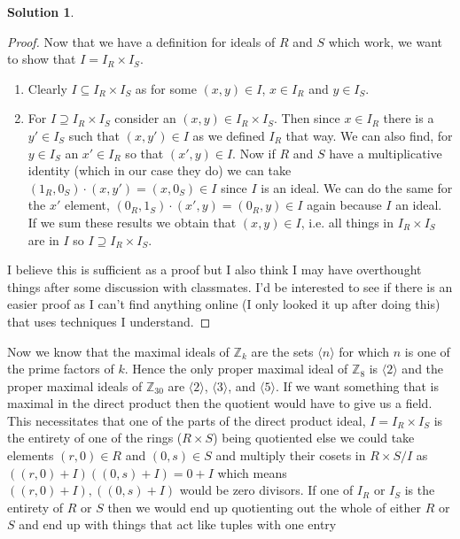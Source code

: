 \documentclass[10pt]{article}
\theoremstyle{definition}
\newtheorem{soln}{Solution}
\newcommand{\hull}[1]{\langle {#1}\rangle}
\begin{document}
\begin{soln}
\begin{enumerate}[label=(\alph*)]
\begin{proof}
            Now that we have a definition for ideals of $R$ and $S$ which work,
            we want to show that $I=I_R\times I_S$.
            \begin{enumerate}
              \item Clearly $I\subseteq I_R\times I_S$ as for some
                    $(x,y)\in I$, $x\in I_R$ and $y \in I_S$.
              \item For $I\supseteq  I_R\times I_S$ consider an $(x,y)\in I_R\times I_S$. Then since
                    $x \in I_R$ there is a $y'\in I_S$ such that $(x,y')\in I$ as we defined $I_R$ that way. We can also find,
                    for $y \in I_S$ an $x'\in I_R$ so that $(x',y)\in I$. Now if $R$ and $S$ have a multiplicative identity (which in our case
                    they do) we can take $(1_R,0_S)\cdot(x,y')=(x,0_S)\in I$ since $I$ is an ideal. We can do the same for the $x'$ element,
                    $(0_R,1_S)\cdot(x',y)=(0_R,y)\in I$ again because $I$ an ideal. If we sum these results we obtain that $(x,y)\in I$, i.e.
                    all things in $I_R\times I_S$ are in $I$ so $I\supseteq  I_R\times I_S$.\qedhere
            \end{enumerate}
            I believe this is sufficient as a proof but I also think I may have overthought things after some discussion with classmates.
            I'd be interested to see if there is an easier proof as I can't find anything online (I only looked it up after doing this)
            that uses techniques I understand.
          \end{proof}
          Now we know that the maximal ideals of $\mathbb{Z}_k$ are the sets $\langle n\rangle$ for which
          $n$ is one of the prime factors of $k$. Hence the only proper maximal ideal of $\mathbb{Z}_8$ is
          $\hull{2}$ and the proper maximal ideals of $\mathbb{Z}_{30}$ are $\hull{2}$, $\hull{3}$, and $\hull{5}$.
          If we want something that is maximal in the direct product
          then the quotient would have to give us a field. This necessitates that one of
          the parts of the direct product ideal, $I=I_R\times I_S$ is the entirety of one of the rings ($R\times S$) being quotiented else
          we could take elements $(r,0)\in R$ and $(0,s)\in S$ and multiply their cosets in $R\times S/I$ as
          $((r,0)+I)((0,s)+I)=0+I$ which means $((r,0)+I),((0,s)+I)$ would be zero divisors. If one of $I_R$ or $I_S$ is the entirety of $R$ or $S$
          then we would end up quotienting out the whole of either $R$ or $S$ and end up with things that act like tuples with one entry

\end{enumerate}
\end{soln}
\end{document}
